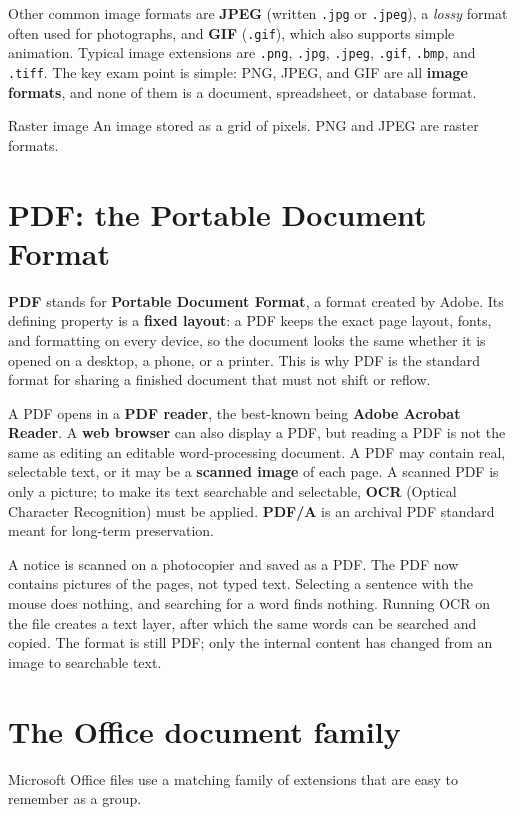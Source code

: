 Other common image formats are \textbf{JPEG} (written \texttt{.jpg} or
\texttt{.jpeg}), a \emph{lossy} format often used for photographs, and
\textbf{GIF} (\texttt{.gif}), which also supports simple animation. Typical
image extensions are \texttt{.png}, \texttt{.jpg}, \texttt{.jpeg},
\texttt{.gif}, \texttt{.bmp}, and \texttt{.tiff}. The key exam point is
simple: PNG, JPEG, and GIF are all \textbf{image formats}, and none of them
is a document, spreadsheet, or database format.

\begin{definitionbox}{Raster image}
An image stored as a grid of pixels. PNG and JPEG are raster formats.
\end{definitionbox}

\section{PDF: the Portable Document Format}
\textbf{PDF} stands for \textbf{Portable Document Format}, a format created
by Adobe. Its defining property is a \textbf{fixed layout}: a PDF keeps the
exact page layout, fonts, and formatting on every device, so the document
looks the same whether it is opened on a desktop, a phone, or a printer. This
is why PDF is the standard format for sharing a finished document that must
not shift or reflow.

A PDF opens in a \textbf{PDF reader}, the best-known being \textbf{Adobe
Acrobat Reader}. A \textbf{web browser} can also display a PDF, but reading a
PDF is not the same as editing an editable word-processing document. A PDF
may contain real, selectable text, or it may be a \textbf{scanned image} of
each page. A scanned PDF is only a picture; to make its text searchable and
selectable, \textbf{OCR} (Optical Character Recognition) must be applied.
\textbf{PDF/A} is an archival PDF standard meant for long-term preservation.

\begin{example}
A notice is scanned on a photocopier and saved as a PDF. The PDF now contains
pictures of the pages, not typed text. Selecting a sentence with the mouse
does nothing, and searching for a word finds nothing. Running OCR on the file
creates a text layer, after which the same words can be searched and copied.
The format is still PDF; only the internal content has changed from an image
to searchable text.
\end{example}

\section{The Office document family}
Microsoft Office files use a matching family of extensions that are easy to
remember as a group.

